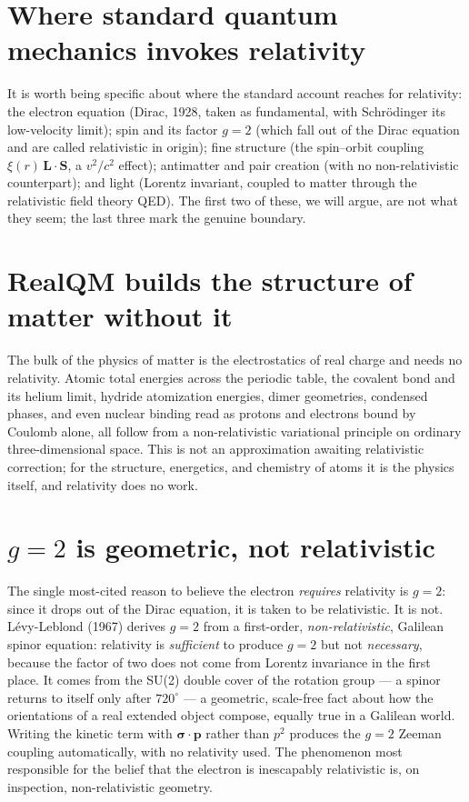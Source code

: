 \documentclass[11pt]{article}
\begin{document}
\section{Where standard quantum mechanics invokes relativity}

It is worth being specific about where the standard account reaches for relativity: the electron equation
(Dirac, 1928, taken as fundamental, with Schr\"odinger its low-velocity limit); spin and its factor $g=2$ (which
fall out of the Dirac equation and are called relativistic in origin); fine structure (the spin--orbit coupling
$\xi(r)\,\mathbf L\!\cdot\!\mathbf S$, a $v^2/c^2$ effect); antimatter and pair creation (with no non-relativistic
counterpart); and light (Lorentz invariant, coupled to matter through the relativistic field theory QED). The
first two of these, we will argue, are not what they seem; the last three mark the genuine boundary.

\section{RealQM builds the structure of matter without it}

The bulk of the physics of matter is the electrostatics of real charge and needs no relativity. Atomic total
energies across the periodic table, the covalent bond and its helium limit, hydride atomization energies, dimer
geometries, condensed phases, and even nuclear binding read as protons and electrons bound by Coulomb alone, all
follow from a non-relativistic variational principle on ordinary three-dimensional space. This is not an
approximation awaiting relativistic correction; for the structure, energetics, and chemistry of atoms it is the
physics itself, and relativity does no work.

\section{$g=2$ is geometric, not relativistic}

The single most-cited reason to believe the electron \emph{requires} relativity is $g=2$: since it drops out of
the Dirac equation, it is taken to be relativistic. It is not. L\'evy-Leblond (1967) derives $g=2$ from a
first-order, \emph{non-relativistic}, Galilean spinor equation: relativity is \emph{sufficient} to produce $g=2$
but not \emph{necessary}, because the factor of two does not come from Lorentz invariance in the first place. It
comes from the SU(2) double cover of the rotation group --- a spinor returns to itself only after $720^\circ$ ---
a geometric, scale-free fact about how the orientations of a real extended object compose, equally true in a
Galilean world. Writing the kinetic term with $\boldsymbol\sigma\!\cdot\!\mathbf p$ rather than $p^2$ produces
the $g=2$ Zeeman coupling automatically, with no relativity used. The phenomenon most responsible for the belief
that the electron is inescapably relativistic is, on inspection, non-relativistic geometry.
\end{document}

